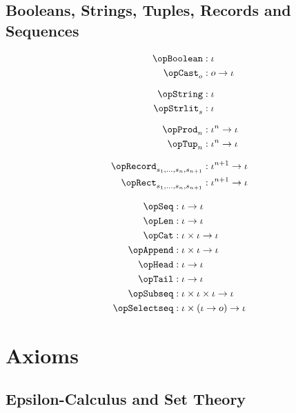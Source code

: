 \documentclass[11pt, a4paper, oneside]{article}
\begin{document}
    \subsection{Booleans, Strings, Tuples, Records and Sequences}

\begin{minipage}[t]{.5\textwidth}
    \begin{align*}
        \opBoolean      &: \idv \\
        \opCast_o       &: o \arr \idv \\[7pt]
        \opString       &: \idv \\
        \opStrlit_s     &: \idv \\[7pt]
        \opProd_n       &: \idv^n \arr \idv \\
        \opTup_n        &: \idv^n \arr \idv \\[7pt]
        \opRecord_{s_1,\dots,s_n,s_{n+1}} &: \idv^{n+1} \arr \idv \\
        \opRect_{s_1,\dots,s_n,s_{n+1}}   &: \idv^{n+1} \arr \idv \\
    \end{align*}
\end{minipage}%
\begin{minipage}[t]{.5\textwidth}
    \begin{align*}
        \opSeq          &: \idv \arr \idv \\
        \opLen          &: \idv \arr \idv \\
        \opCat          &: \idv \times \idv \arr \idv \\
        \opAppend       &: \idv \times \idv \arr \idv \\
        \opHead         &: \idv \arr \idv \\
        \opTail         &: \idv \arr \idv \\
        \opSubseq       &: \idv \times \idv \times \idv \arr \idv \\
        \opSelectseq    &: \idv \times (\idv \arr o) \arr \idv
    \end{align*}
\end{minipage}


\newpage
\section{Axioms}
\label{sec:axioms}

    \subsection{Epsilon-Calculus and Set Theory}
    \label{subsec:epsilon_and_sets}
\end{document}
